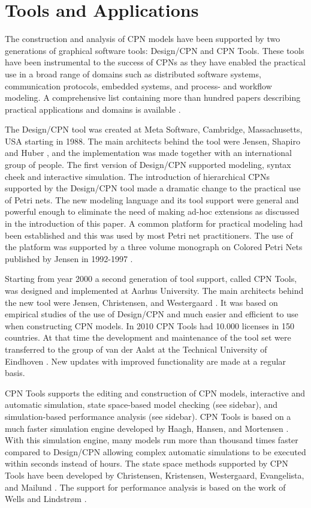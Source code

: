 \section{Tools and Applications}

The construction and analysis of CPN models have been supported by two
generations of graphical software tools: Design/CPN and CPN
Tools. These tools have been instrumental to the success of CPNs as
they have enabled the practical use in a broad range of domains such
as distributed software systems, communication protocols, embedded
systems, and process- and workflow modeling. A comprehensive list
containing more than hundred papers describing practical applications
and domains is available \cite{cpnuse}.

The Design/CPN tool \cite{tacas97} was created at Meta Software,
Cambridge, Massachusetts, USA starting in 1988. The main architects
behind the tool were Jensen, Shapiro and Huber
\cite{jensen:cpnmanual}, and the implementation was made together with
an international group of people. The first version of Design/CPN
supported modeling, syntax cheek and interactive simulation. The
introduction of hierarchical CPNs supported by the Design/CPN tool
made a dramatic change to the practical use of Petri nets. The new
modeling language and its tool support were general and powerful
enough to eliminate the need of making ad-hoc extensions as discussed
in the introduction of this paper. A common platform for practical
modeling had been established and this was used by most Petri net
practitioners. The use of the platform was supported by a three volume
monograph on Colored Petri Nets published by Jensen in 1992-1997
\cite{jensen:cpnvols}.  

Starting from year 2000 a second generation of tool support, called
CPN Tools, was designed and implemented at Aarhus University. The main
architects behind the new tool were Jensen, Christensen, and
Westergaard \cite{cpn2003}.  It was based on empirical studies of the
use of Design/CPN and much easier and efficient to use when
constructing CPN models. In 2010 CPN Tools had 10.000 licenses in 150
countries. At that time the development and maintenance of the tool
set were transferred to the group of van der Aalst at the Technical
University of Eindhoven \cite{cpntoolsweb}. New updates with improved
functionality are made at a regular basis.

CPN Tools supports the editing and construction of CPN models,
interactive and automatic simulation, state space-based model checking
(see sidebar), and simulation-based performance analysis (see
sidebar). CPN Tools is based on a much faster simulation engine
developed by Haagh, Hansen, and Mortensen \cite{mortensen:01}. With
this simulation engine, many models run more than thousand times
faster compared to Design/CPN allowing complex automatic simulations
to be executed within seconds instead of hours. The state space
methods supported by CPN Tools have been developed by Christensen,
Kristensen, Westergaard, Evangelista, and Mailund
\cite{sweep,asap}. The support for performance
analysis is based on the work of Wells and Lindstr\o{}m
\cite{performance1}.

